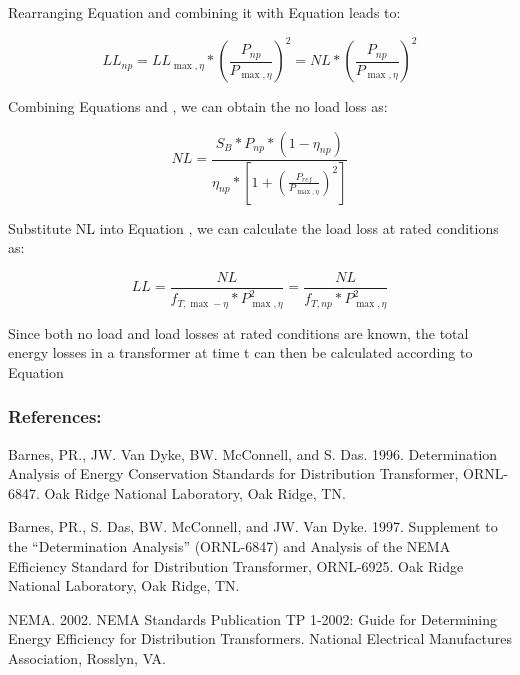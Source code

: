 Rearranging Equation and combining it with Equation leads to:

\begin{equation}
L{L_{np}} = L{L_{\max ,\eta }}*{\left( {\frac{{{P_{np}}}}{{{P_{\max ,\eta }}}}} \right)^2} = NL*{\left( {\frac{{{P_{np}}}}{{{P_{\max ,\eta }}}}} \right)^2}
\end{equation}

Combining Equations and , we can obtain the no load loss as:

\begin{equation}
NL = \frac{{{S_B}*{P_{np}}*(1 - {\eta_{np}})}}{{{\eta_{np}}*\left[ {1 + {{\left( {\frac{{{P_{ref}}}}{{P{}_{\max ,\eta }}}} \right)}^2}} \right]}}
\end{equation}

Substitute NL into Equation , we can calculate the load loss at rated conditions as:

\begin{equation}
LL = \frac{{NL}}{{{f_{T,\max  - \eta }}*P_{\max ,\eta }^2}} = \frac{{NL}}{{{f_{T,np}}*P_{\max ,\eta }^2}}
\end{equation}

Since both no load and load losses at rated conditions are known, the total energy losses in a transformer at time t can then be calculated according to Equation

\subsubsection{References:}\label{references-1-008}

Barnes, PR., JW. Van Dyke, BW. McConnell, and S. Das. 1996. Determination Analysis of Energy Conservation Standards for Distribution Transformer, ORNL-6847. Oak Ridge National Laboratory, Oak Ridge, TN.

Barnes, PR., S. Das, BW. McConnell, and JW. Van Dyke. 1997. Supplement to the ``Determination Analysis'' (ORNL-6847) and Analysis of the NEMA Efficiency Standard for Distribution Transformer, ORNL-6925. Oak Ridge National Laboratory, Oak Ridge, TN.

NEMA. 2002. NEMA Standards Publication TP 1-2002: Guide for Determining Energy Efficiency for Distribution Transformers. National Electrical Manufactures Association, Rosslyn, VA.
